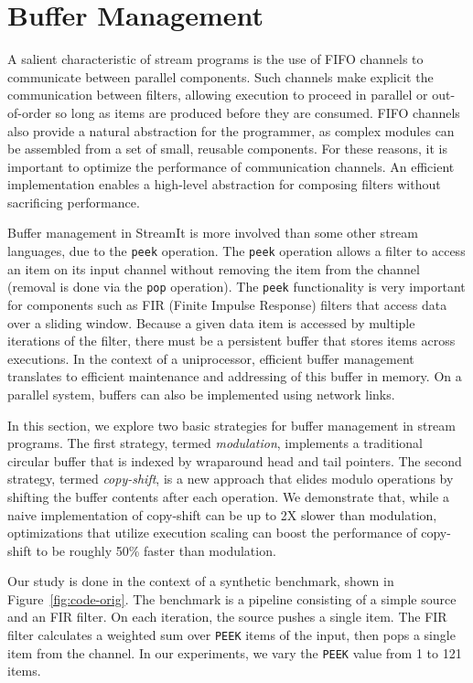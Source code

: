 \section{Buffer Management}
\label{sec:buffer}

A salient characteristic of stream programs is the use of FIFO
channels to communicate between parallel components.  Such channels
make explicit the communication between filters, allowing execution to
proceed in parallel or out-of-order so long as items are produced
before they are consumed.  FIFO channels also provide a natural
abstraction for the programmer, as complex modules can be assembled
from a set of small, reusable components.  For these reasons, it is
important to optimize the performance of communication channels.  An
efficient implementation enables a high-level abstraction for
composing filters without sacrificing performance.

Buffer management in StreamIt is more involved than some other stream
languages, due to the {\tt peek} operation.  The {\tt peek} operation
allows a filter to access an item on its input channel without
removing the item from the channel (removal is done via the {\tt pop}
operation).  The {\tt peek} functionality is very important for
components such as FIR (Finite Impulse Response) filters that access
data over a sliding window.  Because a given data item is accessed by
multiple iterations of the filter, there must be a persistent buffer
that stores items across executions.  In the context of a
uniprocessor, efficient buffer management translates to efficient
maintenance and addressing of this buffer in memory.  On a parallel
system, buffers can also be implemented using network links.

In this section, we explore two basic strategies for buffer management
in stream programs.  The first strategy, termed {\it modulation},
implements a traditional circular buffer that is indexed by wraparound
head and tail pointers.  The second strategy, termed {\it copy-shift},
is a new approach that elides modulo operations by shifting the buffer
contents after each operation.  We demonstrate that, while a naive
implementation of copy-shift can be up to 2X slower than modulation,
optimizations that utilize execution scaling can boost the performance
of copy-shift to be roughly 50\% faster than modulation.



Our study is done in the context of a synthetic benchmark, shown in
Figure~\ref{fig:code-orig}.  
The benchmark is a pipeline consisting of a simple source and an FIR
filter.  On each iteration, the source pushes a single item.  The FIR
filter calculates a weighted sum over {\tt PEEK} items of the input,
then pops a single item from the channel.  In our experiments, we vary
the {\tt PEEK} value from 1 to 121 items.

